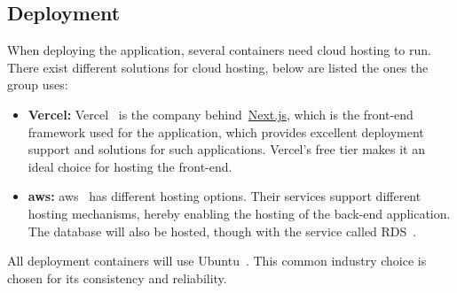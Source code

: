 \subsection{Deployment}\label{subsec:deployment}

When deploying the application, several containers need cloud hosting to run.
There exist different solutions for cloud hosting, below are listed the ones the group uses:

\begin{itemize}
    \item \textbf{Vercel:}
    Vercel~\cite{vercel2024} is the company behind~\url{Next.js}, which is the front-end framework used for the
    application, which provides excellent deployment support and solutions for such applications.
    Vercel’s free tier makes it an ideal choice for hosting the front-end.

    \item \textbf{\acrfull{aws}:}
    \acrshort{aws}~\cite{aws2024} has different hosting options.
    Their services support different hosting mechanisms, hereby enabling the hosting of the back-end application.
    The database will also be hosted, though with the service called RDS~\cite{rds2024}.
\end{itemize}

All deployment containers will use Ubuntu~\cite{ubuntu2024}.
This common industry choice is chosen for its consistency and reliability.
